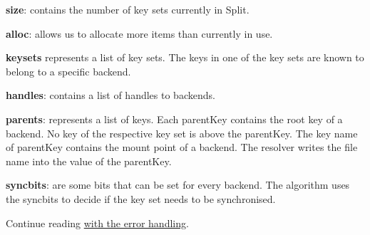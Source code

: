 \begin{DoxyItemize}
\item {\bfseries size}\+: contains the number of key sets currently in {\ttfamily Split}.
\item {\bfseries alloc}\+: allows us to allocate more items than currently in use.
\item {\bfseries keysets} represents a list of key sets. The keys in one of the key sets are known to belong to a specific backend.
\item {\bfseries handles}\+: contains a list of handles to backends.
\item {\bfseries parents}\+: represents a list of keys. Each {\ttfamily parent\+Key} contains the root key of a backend. No key of the respective key set is above the {\ttfamily parent\+Key}. The key name of {\ttfamily parent\+Key} contains the mount point of a backend. The resolver writes the file name into the value of the {\ttfamily parent\+Key}.
\item {\bfseries syncbits}\+: are some bits that can be set for every backend. The algorithm uses the {\ttfamily syncbits} to decide if the key set needs to be synchronised.
\end{DoxyItemize}

Continue reading \hyperlink{md_doc_help_elektra-error-handling_doc_help_elektra-error-handling_md}{with the error handling}. 